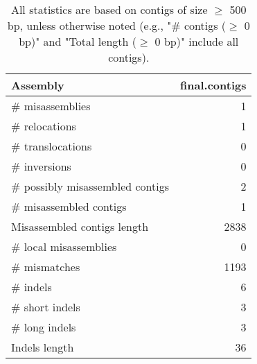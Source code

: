 \documentclass[12pt,a4paper]{article}
\begin{document}
\begin{table}[ht]
\begin{center}
\caption{All statistics are based on contigs of size $\geq$ 500 bp, unless otherwise noted (e.g., "\# contigs ($\geq$ 0 bp)" and "Total length ($\geq$ 0 bp)" include all contigs).}
\begin{tabular}{|l*{1}{|r}|}
\hline
Assembly & final.contigs \\ \hline
\# misassemblies & 1 \\ \hline
\hspace{5mm}\# relocations & 1 \\ \hline
\hspace{5mm}\# translocations & 0 \\ \hline
\hspace{5mm}\# inversions & 0 \\ \hline
\# possibly misassembled contigs & 2 \\ \hline
\# misassembled contigs & 1 \\ \hline
Misassembled contigs length & 2838 \\ \hline
\# local misassemblies & 0 \\ \hline
\# mismatches & 1193 \\ \hline
\# indels & 6 \\ \hline
\hspace{5mm}\# short indels & 3 \\ \hline
\hspace{5mm}\# long indels & 3 \\ \hline
Indels length & 36 \\ \hline
\end{tabular}
\end{center}
\end{table}
\end{document}
